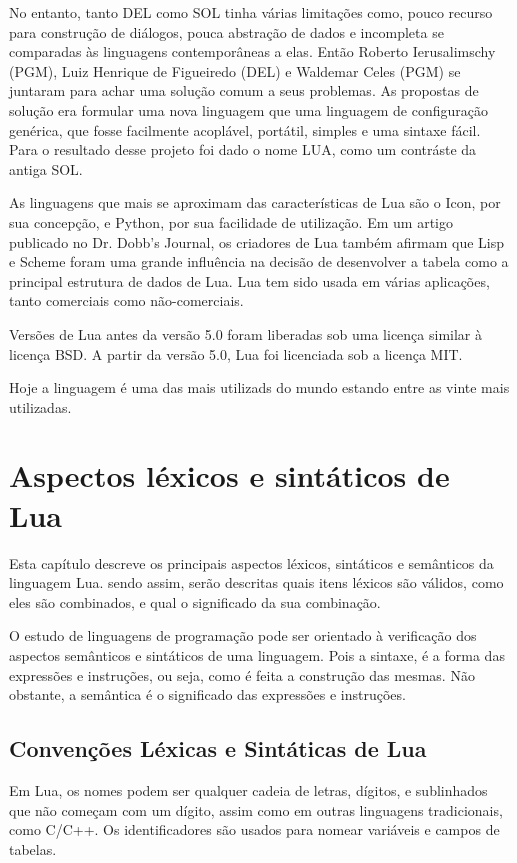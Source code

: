 \documentclass[
	12pt,				%
	openright,			%
	twoside,			%
	a4paper,			%
	english,			%
	brazil,				%
	]{abntex2}
\begin{document}
No entanto, tanto DEL como SOL tinha várias limitações como, pouco recurso para construção de diálogos, pouca abstração de dados e incompleta se comparadas às linguagens contemporâneas a elas. Então Roberto Ierusalimschy (PGM), Luiz Henrique de Figueiredo (DEL) e Waldemar Celes (PGM) se juntaram para achar uma solução comum a seus problemas. As propostas de solução era formular uma nova linguagem que uma linguagem de configuração genérica, que fosse facilmente acoplável, portátil, simples e uma sintaxe fácil. Para o resultado desse projeto foi dado o nome LUA, como um contráste da antiga SOL. 

As linguagens que mais se aproximam das características de Lua são o Icon, por sua concepção, e Python, por sua facilidade de utilização. Em um artigo publicado no Dr. Dobb's Journal, os criadores de Lua também afirmam que Lisp e Scheme foram uma grande influência na decisão de desenvolver a tabela como a principal estrutura de dados de Lua. Lua tem sido usada em várias aplicações, tanto comerciais como não-comerciais.

Versões de Lua antes da versão 5.0 foram liberadas sob uma licença similar à licença BSD. A partir da versão 5.0, Lua foi licenciada sob a licença MIT.

Hoje a linguagem é uma das mais utilizads do mundo estando entre as vinte mais utilizadas.

\chapter{Aspectos léxicos e sintáticos de Lua}
Esta capítulo descreve os principais aspectos léxicos, sintáticos e semânticos da linguagem Lua. sendo assim, serão descritas quais itens léxicos são válidos, como eles são combinados, e qual o significado da sua combinação.

O estudo de linguagens de programação pode ser orientado à verificação dos aspectos semânticos e sintáticos de uma linguagem. Pois a sintaxe, é a forma das expressões e instruções, ou seja, como é feita a construção das mesmas. Não obstante, a semântica é o significado das expressões e instruções.

\section{Convenções Léxicas e Sintáticas de Lua}
Em Lua, os nomes podem ser qualquer cadeia de letras, dígitos, e sublinhados que não começam com um dígito, assim como em outras linguagens tradicionais, como C/C++. Os identificadores são usados para nomear variáveis e campos de tabelas.
\end{document}
